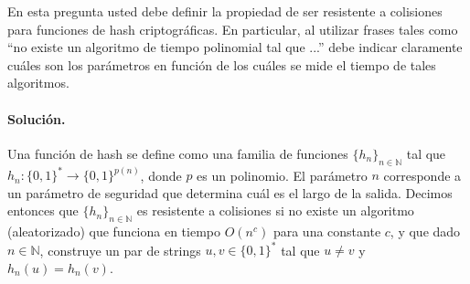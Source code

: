 En esta pregunta usted debe definir la propiedad de ser resistente a colisiones para funciones de hash criptográficas. En particular, al utilizar frases tales como ``no existe un algoritmo de tiempo polinomial tal que ...''  debe indicar claramente cuáles son los parámetros en función de los cuáles se mide el tiempo de tales algoritmos.


\paragraph{Solución.} Una función de hash se define como una familia de funciones $\{h_n\}_{n \in \mathbb{N}}$ tal que $h_n : \{0,1\}^* \to \{0,1\}^{p(n)}$, donde $p$ es un polinomio. El parámetro $n$ corresponde a un parámetro de seguridad que determina cuál es el largo de la salida. Decimos entonces que $\{h_n\}_{n \in \mathbb{N}}$ es resistente a colisiones si no existe un algoritmo (aleatorizado) que funciona en tiempo $O(n^c)$ para una constante $c$, y que dado $n \in \mathbb{N}$, construye un par de strings $u, v \in \{0,1\}^*$ tal que $u \neq v$ y $h_n(u) = h_n(v)$.
